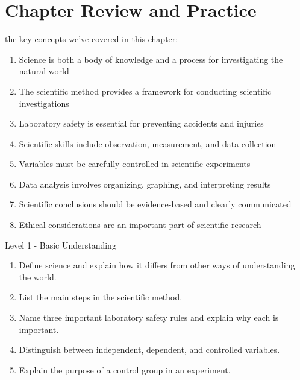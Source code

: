 \section{Chapter Review and Practice}

 the key concepts we've covered in this chapter:

\begin{enumerate}
    \item Science is both a body of knowledge and a process for investigating the natural world
    \item The scientific method provides a framework for conducting scientific investigations
    \item Laboratory safety is essential for preventing accidents and injuries
    \item Scientific skills include observation, measurement, and data collection
    \item Variables must be carefully controlled in scientific experiments
    \item Data analysis involves organizing, graphing, and interpreting results
    \item Scientific conclusions should be evidence-based and clearly communicated
    \item Ethical considerations are an important part of scientific research
\end{enumerate}

\begin{tieredquestions}{Level 1 - Basic Understanding}
\begin{enumerate}
    \item Define science and explain how it differs from other ways of understanding the world.
    \item List the main steps in the scientific method.
    \item Name three important laboratory safety rules and explain why each is important.
    \item Distinguish between independent, dependent, and controlled variables.
    \item Explain the purpose of a control group in an experiment.
\end{enumerate}
\end{tieredquestions}

